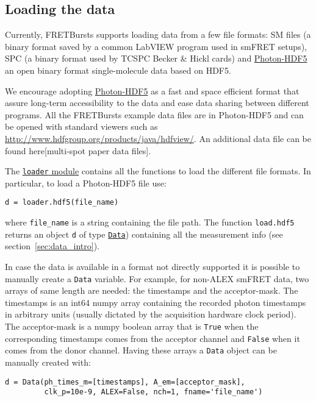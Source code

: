 \subsection{Loading the data}
Currently, FRETBursts supports loading data from a few file formats: SM files (a binary format saved by a common LabVIEW program used in smFRET setups), SPC (a binary format used by TCSPC Becker \& Hickl cards) and \href{http://photon-hdf5.readthedocs.org/}{Photon-HDF5}  an open binary format single-molecule data based on HDF5.

We encourage adopting \href{http://photon-hdf5.readthedocs.org/}{Photon-HDF5} as a fast and space efficient format that assure long-term accessibility to the data and ease data sharing between different programs. All the FRETBursts example data files are in Photon-HDF5 and can be opened with standard viewers such as \href{HDFView}{http://www.hdfgroup.org/products/java/hdfview/}. An additional data file can be found here[multi-spot paper data files].

The \href{http://fretbursts.readthedocs.org/en/latest/loader.html}{\texttt{loader} module}
contains all the functions to load the different file formats. In particular, to load a Photon-HDF5 file use:

\begin{verbatim}
d = loader.hdf5(file_name)
\end{verbatim}

where \verb|file_name| is a string containing the file path. The function \verb|load.hdf5| returns an object \verb|d| of type \href{http://fretbursts.readthedocs.org/en/latest/data_class.html}{\texttt{Data}}) containing all the measurement info (see section~\ref{sec:data_intro}).

In case the data is available in a format not directly supported it is possible to manually create a \verb|Data| variable. For example, for non-ALEX smFRET data, two arrays of same length are needed: the timestamps and the acceptor-mask. The timestamps is an int64 numpy array containing the recorded photon timestamps in arbitrary units (usually dictated by the acquisition hardware clock period). The acceptor-mask is a numpy boolean array that is \verb|True| when the corresponding timestamps comes from the acceptor channel and \verb|False| when it comes from the donor channel. Having these arrays a \verb|Data| object can be manually created with:

\begin{verbatim}
d = Data(ph_times_m=[timestamps], A_em=[acceptor_mask], 
         clk_p=10e-9, ALEX=False, nch=1, fname='file_name')
\end{verbatim}

